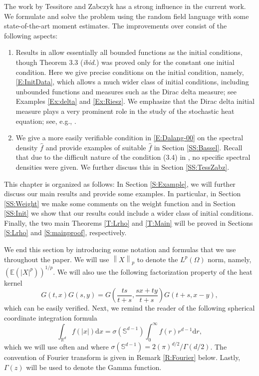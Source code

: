 \documentclass[12pt]{report}
\theoremstyle{plain}
\theoremstyle{definition}
\numberwithin{equation}{section}
\newcommand{\R}{\mathbb{R}}
\newcommand{\Norm}[1]{\left\|  #1   \right\|}
\newcommand{\ud}{\ensuremath{ \mathrm{d} }}
\begin{document}
The work by Tessitore and Zabczyk \cite{tessitore.zabczyk:98:invariant} has a strong influence in
the current work. We formulate and solve the problem using the random field language with some
state-of-the-art moment estimates. The improvements over \cite{tessitore.zabczyk:98:invariant} consist
of the following aspects:
\begin{enumerate}
	\item Results in \cite{tessitore.zabczyk:98:invariant} allow essentially all bounded functions as
	the initial conditions, though Theorem 3.3 ({\it ibid.}) was proved only for the constant one
	initial condition. Here we give precise conditions on the initial condition, namely,
	\eqref{E:InitData}, which allows a much wider class of initial conditions, including unbounded
	functions and measures such as the Dirac delta measure; see Examples \ref{Ex:delta} and
	\ref{Ex:Riesz}. We emphasize that the Dirac delta initial measure plays a very prominent role in
	the study of the stochastic heat equation; see, e.g., \cite{amir.corwin.ea:11:probability}.
	\item We give a more easily verifiable condition in \eqref{E:Dalang-00} on the spectral density $\hat f$ and provide examples of suitable $\hat f$ in Section \ref{SS:Bassel}. Recall that due to the difficult nature of the condition (3.4) in \cite{tessitore.zabczyk:98:invariant}, no specific spectral densities were given. We further discuss this in Section \ref{SS:TessZabz}.
\end{enumerate}

This chapter is organized as follows: In Section \ref{S:Example}, we will further discuss our main results and provide some examples. In particular, in Section \ref{SS:Weight}  we make some comments on the weight function and in Section \ref{SS:Init} we show that our results could include a wider class of initial conditions. Finally, the two main Theorems \ref{T:Lrho} and \ref{T:Main} will be proved in Sections \ref{S:Lrho}
and \ref{S:mainproof}, respectively.
\bigskip

We end this section by introducing some notation and formulas that we use throughout the paper. We will use $\Norm{X}_p $ to denote the $L^p(\Omega)$ norm, namely,
$\left(\mathbb{E}(|X|^p)\right)^{1/p}$. We will also use the following factorization
property of the heat kernel
\begin{equation} \label{E:gsim}
G(t,x)G(s,y)=G\left(\frac{ts}{t+s}, \frac{sx + ty}{t+s}\right)G\left(t+s, x-y\right),
\end{equation}
which can be easily verified. Next, we remind the reader of the following spherical coordinate integration formula
\[
\int_{\R^d} f(|x|) \ud x = \sigma(\mathbb{S}^{d-1}) \int_0^\infty f(r) r^{d-1} \ud r,
\]
which we will use often and where $\sigma(\mathbb{S}^{d-1})  = 2(\pi)^{d/2} / \Gamma(d/2)$.
The convention of Fourier transform is given in Remark \ref{R:Fourier}
below. Lastly, $\Gamma(z)$ will be used to denote the Gamma function. 
\end{document}
